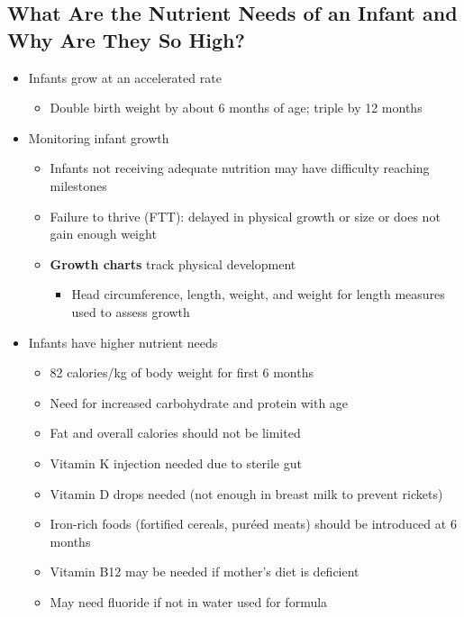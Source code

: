 \documentclass[12pt]{article}
\begin{document}
        \subsection{What Are the Nutrient Needs of an Infant and Why Are They So High?}
            \begin{itemize}
                \item Infants grow at an accelerated rate
                    \begin{itemize}
                        \item Double birth weight by about 6 months of age; triple by 12 months
                    \end{itemize}
                \item Monitoring infant growth
                    \begin{itemize}
                        \item Infants not receiving adequate nutrition may have difficulty reaching milestones
                        \item Failure to thrive (FTT): delayed in physical growth or size or does not gain enough weight
                        \item \textbf{Growth charts} track physical development
                            \begin{itemize}
                                \item Head circumference, length, weight, and weight for length measures used to assess growth
                            \end{itemize}
                    \end{itemize}
                \item Infants have higher nutrient needs
                    \begin{itemize}
                        \item 82 calories/kg of body weight for first 6 months
                        \item Need for increased carbohydrate and protein with age
                        \item Fat and overall calories should not be limited
                        \item Vitamin K injection needed due to sterile gut
                        \item Vitamin D drops needed (not enough in breast milk to prevent rickets)
                        \item Iron-rich foods (fortified cereals, puréed meats) should be introduced at 6 months
                        \item Vitamin B12 may be needed if mother's diet is deficient
                        \item May need fluoride if not in water used for formula
                    \end{itemize}
            \end{itemize}
\end{document}
